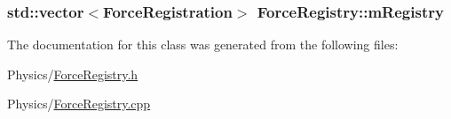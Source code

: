 \subsubsection[{\texorpdfstring{m\+Registry}{mRegistry}}]{\setlength{\rightskip}{0pt plus 5cm}std\+::vector$<${\bf Force\+Registration}$>$ Force\+Registry\+::m\+Registry\hspace{0.3cm}{\ttfamily [private]}}\hypertarget{classForceRegistry_af77d26c421a8c2eb8c9975f76c775f58}{}\label{classForceRegistry_af77d26c421a8c2eb8c9975f76c775f58}


The documentation for this class was generated from the following files\+:\begin{DoxyCompactItemize}
\item 
Physics/\hyperlink{ForceRegistry_8h}{Force\+Registry.\+h}\item 
Physics/\hyperlink{ForceRegistry_8cpp}{Force\+Registry.\+cpp}\end{DoxyCompactItemize}
